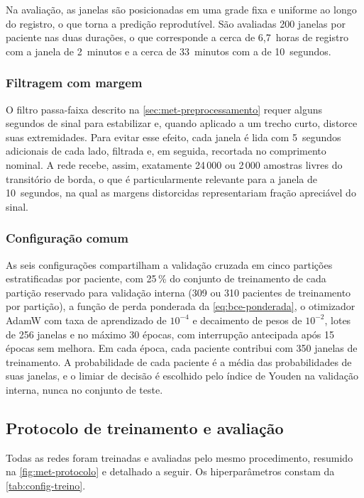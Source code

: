 Na avaliação, as janelas são posicionadas em uma grade fixa e uniforme ao
longo do registro, o que torna a predição reprodutível. São avaliadas 200 janelas
por paciente nas duas durações, o que corresponde a cerca de 6,7~horas de
registro com a janela de 2~minutos e a cerca de 33~minutos com a de
10~segundos.

\subsubsection{Filtragem com margem}

O filtro passa-faixa descrito na \autoref{sec:met-preprocessamento} requer
alguns segundos de sinal para estabilizar e, quando aplicado a um trecho
curto, distorce suas extremidades. Para evitar esse efeito, cada janela é
lida com 5~segundos adicionais de cada lado, filtrada e, em seguida,
recortada no comprimento nominal. A rede recebe, assim, exatamente 24\,000 ou
2\,000 amostras livres do transitório de borda, o que é particularmente
relevante para a janela de 10~segundos, na qual as margens distorcidas
representariam fração apreciável do sinal.

\subsubsection{Configuração comum}

As seis configurações compartilham a validação cruzada em cinco partições
estratificadas por paciente, com 25\,\% do conjunto de treinamento de cada
partição reservado para validação interna (309 ou 310 pacientes de
treinamento por partição), a função de perda ponderada da
\autoref{eq:bce-ponderada}, o otimizador AdamW com taxa de aprendizado de
$10^{-4}$ e decaimento de pesos de $10^{-2}$, lotes de 256 janelas e
no máximo 30 épocas, com interrupção antecipada após 15 épocas sem melhora. Em cada época, cada paciente contribui com 350 janelas de treinamento.
A probabilidade de cada paciente é a média das probabilidades de suas
janelas, e o limiar de decisão é escolhido pelo índice de Youden na
validação interna, nunca no conjunto de teste.



\subsection{Protocolo de treinamento e avaliação}
\label{subsec:met-protocolo-redes}

Todas as redes foram treinadas e avaliadas pelo mesmo procedimento,
resumido na \autoref{fig:met-protocolo} e detalhado a seguir. Os
hiperparâmetros constam da \autoref{tab:config-treino}.

